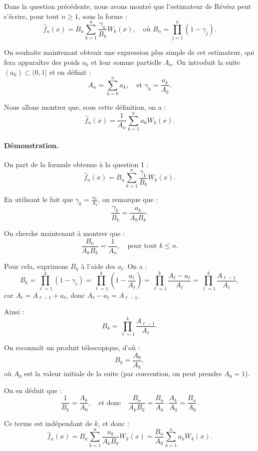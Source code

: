 \documentclass[12pt]{article}
\begin{document}
Dans la question précédente, nous avons montré que l’estimateur de Révész peut s’écrire, pour tout \( n \geq 1 \), sous la forme :
\[
\hat{f}_n(x) = B_n \sum_{k=1}^n \frac{\gamma_k}{B_k} W_k(x),
\quad \text{où } B_n = \prod_{j=1}^n (1 - \gamma_j).
\]

On souhaite maintenant obtenir une expression plus simple de cet estimateur, qui fera apparaître des poids \( a_k \) et leur somme partielle \( A_n \). On introduit la suite \( (a_k) \subset (0, 1] \) et on définit :
\[
A_n = \sum_{k=0}^n a_k, \quad \text{et } \gamma_k = \frac{a_k}{A_k}.
\]

Nous allons montrer que, sous cette définition, on a :
\[
\hat{f}_n(x) = \frac{1}{A_n} \sum_{k=1}^n a_k W_k(x).
\]

\paragraph{Démonstration.}

On part de la formule obtenue à la question 1 :
\[
\hat{f}_n(x) = B_n \sum_{k=1}^n \frac{\gamma_k}{B_k} W_k(x).
\]

En utilisant le fait que \( \gamma_k = \frac{a_k}{A_k} \), on remarque que :
\[
\frac{\gamma_k}{B_k} = \frac{a_k}{A_k B_k}.
\]

On cherche maintenant à montrer que :
\[
\frac{B_n}{A_k B_k} = \frac{1}{A_n}, \quad \text{pour tout } k \leq n.
\]

Pour cela, exprimons \( B_k \) à l’aide des \( a_l \). On a :
\[
B_k = \prod_{\ell=1}^k \left(1 - \gamma_\ell\right) = \prod_{\ell=1}^k \left(1 - \frac{a_\ell}{A_\ell} \right) = \prod_{\ell=1}^k \frac{A_\ell - a_\ell}{A_\ell} = \prod_{\ell=1}^k \frac{A_{\ell-1}}{A_\ell},
\]
car \( A_\ell = A_{\ell-1} + a_\ell \), donc \( A_\ell - a_\ell = A_{\ell-1} \).

Ainsi :
\[
B_k = \prod_{\ell=1}^k \frac{A_{\ell-1}}{A_\ell}.
\]

On reconnaît un produit télescopique, d’où :
\[
B_k = \frac{A_0}{A_k},
\]
où \( A_0 \) est la valeur initiale de la suite (par convention, on peut prendre \( A_0 = 1 \)).

On en déduit que :
\[
\frac{1}{B_k} = \frac{A_k}{A_0},
\quad \text{et donc} \quad \frac{B_n}{A_k B_k} = \frac{B_n}{A_k} \cdot \frac{A_k}{A_0} = \frac{B_n}{A_0}.
\]

Ce terme est indépendant de \( k \), et donc :
\[
\hat{f}_n(x) = B_n \sum_{k=1}^n \frac{a_k}{A_k B_k} W_k(x)
= \frac{B_n}{A_0} \sum_{k=1}^n a_k W_k(x).
\]
\end{document}
